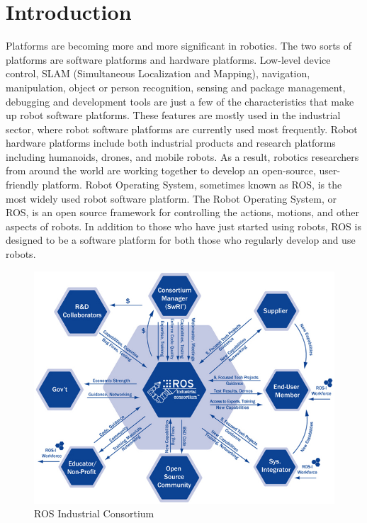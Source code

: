 \section{Introduction}
Platforms are becoming more and more significant in robotics. The two sorts of platforms are software platforms and hardware platforms. Low-level device control, SLAM (Simultaneous Localization and Mapping), navigation, manipulation, object or person recognition, sensing and package management, debugging and development tools are just a few of the characteristics that make up robot software platforms. These features are mostly used in the industrial sector, where robot software platforms are currently used most frequently. Robot hardware platforms include both industrial products and research platforms including humanoids, drones, and mobile robots. As a result, robotics researchers from around the world are working together to develop an open-source, user-friendly platform. Robot Operating System, sometimes known as ROS, is the most widely used robot software platform. The Robot Operating System, or ROS, is an open source framework for controlling the actions, motions, and other aspects of robots. In addition to those who have just started using robots, ROS is designed to be a software platform for both those who regularly develop and use robots.
\begin{figure}[H]
    \centering
    \includegraphics[scale=0.35]{Images/Chapter 2/ros_consortium.jpg}
    \caption{ROS Industrial Consortium}
    \label{fig:ros_consortium}
\end{figure}
\newpage
